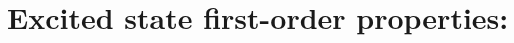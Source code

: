 
\section{Excited state first-order properties: }\label{sec:ccexgr}

\begin{description}
\item[] 
%
\item[] 
%
\item[] 
%
\item[] 
%
\item[] 
%
\item[] 
%
\item[] 
%
\item[] 
%
\item[] 
%
\end{description}
